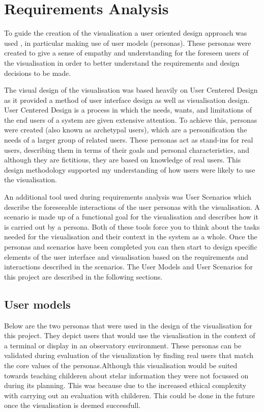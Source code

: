 \chapter{Requirements Analysis}\label{Chap:ra}
To guide the creation of the visualisation a user oriented design approach was
used \cite{AboutFace3}, in particular making use of user models (personas). These personas were
created to give a sense of empathy and understanding for the foreseen users of
the visualisation in order to better understand the requirements and design
decisions to be made. 

The visual design of the visualisation was based heavily on User Centered Design as it
provided a method of user interface design as well as visualisation design. User
Centered Design is a process in which the needs, wants, and limitations of the
end users of a system are given extensive attention. To achieve this, personas
were created (also known as archetypal users), which are a personification the
needs of a larger group of related users. These personas act as stand-ins for
real users, describing them in terms of their goals and personal
characteristics, and although they are fictitious, they are based on knowledge
of real users. This design methodology supported my understanding of how users
were likely to use the visualisation.

An additional tool used during requirements analysis was User Scenarios which
describe the foreseeable interactions of the user personas with the
visualisation. A scenario is made up of a functional goal for the visualisation
and describes how it is carried out by a persona. Both of these tools force you
to think about the tasks needed for the visualisation and their context in the
system as a whole. Once the personas and scenarios have been completed you can
then start to design specific elements of the user interface and visualisation
based on the requirements and interactions described in the scenarios. The User
Models and User Scenarios for this project are described in the following
sections.


\section{User models}
Below are the two personas that were used in the design of the visualisation for
this project. They depict users that would use the visualisation in the context
of a terminal or display in an observatory environment. These personas  can be
validated during evaluation of the visualization by finding real users that
match the core values of the personas.Although this visualisation would be
suited towards teaching childeren about stelar information they were not
focussed on during its planning. This was because due to the increased ethical
complexity with carrying out an evaluation with childeren. This could be done in
the future once the visualisation is deemed successfull. 

